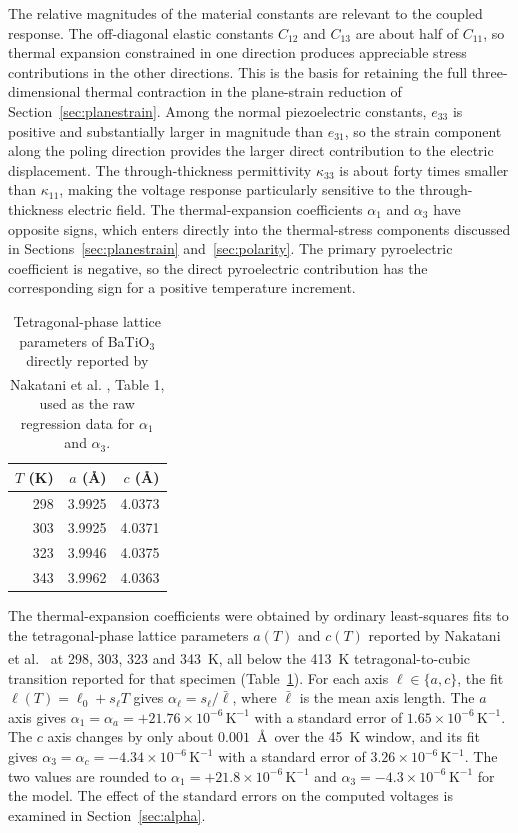 \documentclass[a4paper, 11pt, twoside]{article}
\newcommand{\supercite}[1]{\!\!\textsuperscript{\cite{#1}}}
\begin{document}
The relative magnitudes of the material constants are relevant to the coupled response.
The off-diagonal elastic constants $C_{12}$ and $C_{13}$ are about half of $C_{11}$,
so thermal expansion constrained in one direction produces appreciable stress
contributions in the other directions. This is the basis for retaining the full
three-dimensional thermal contraction in the plane-strain reduction of
Section~\ref{sec:planestrain}. Among the normal piezoelectric constants, $e_{33}$ is
positive and substantially larger in magnitude than $e_{31}$, so the strain component
along the poling direction provides the larger direct contribution to the electric
displacement. The through-thickness permittivity $\kappa_{33}$ is about forty times
smaller than $\kappa_{11}$, making the voltage response particularly sensitive to the
through-thickness electric field. The thermal-expansion coefficients $\alpha_1$ and
$\alpha_3$ have opposite signs, which enters directly into the thermal-stress
components discussed in Sections~\ref{sec:planestrain} and~\ref{sec:polarity}. The
primary pyroelectric coefficient is negative, so the direct pyroelectric contribution
has the corresponding sign for a positive temperature increment.

\begin{table}[h]
\centering
\caption{Tetragonal-phase lattice parameters of BaTiO$_3$ directly reported by
Nakatani et al. \supercite{Nakatani2016}, Table 1, used as the raw regression data for
$\alpha_1$ and $\alpha_3$.}
\label{tab:nakatani-raw}
\begin{tabular}{@{}rrr@{}}
\toprule
$T$ (K) & $a$ (\AA) & $c$ (\AA) \\
\midrule
298 & 3.9925 & 4.0373 \\
303 & 3.9925 & 4.0371 \\
323 & 3.9946 & 4.0375 \\
343 & 3.9962 & 4.0363 \\
\bottomrule
\end{tabular}
\end{table}

The thermal-expansion coefficients were obtained by ordinary least-squares fits to the
tetragonal-phase lattice parameters $a(T)$ and $c(T)$ reported by Nakatani et al.\
\supercite{Nakatani2016} at 298, 303, 323 and 343~K, all below the 413~K
tetragonal-to-cubic transition reported for that specimen
(Table~\ref{tab:nakatani-raw}). For each axis $\ell\in\{a,c\}$, the fit
$\ell(T)=\ell_0+s_\ell T$ gives $\alpha_\ell=s_\ell/\bar\ell$, where $\bar\ell$ is the
mean axis length. The $a$ axis gives
$\alpha_1=\alpha_a=+21.76\times10^{-6}\,\text{K}^{-1}$ with a standard error of
$1.65\times10^{-6}\,\text{K}^{-1}$. The $c$ axis changes by only about $0.001$~\AA\
over the 45~K window, and its fit gives
$\alpha_3=\alpha_c=-4.34\times10^{-6}\,\text{K}^{-1}$ with a standard error of
$3.26\times10^{-6}\,\text{K}^{-1}$. The two values are rounded to
$\alpha_1=+21.8\times10^{-6}\,\text{K}^{-1}$ and
$\alpha_3=-4.3\times10^{-6}\,\text{K}^{-1}$ for the model. The effect of the standard
errors on the computed voltages is examined in Section~\ref{sec:alpha}.
\end{document}
